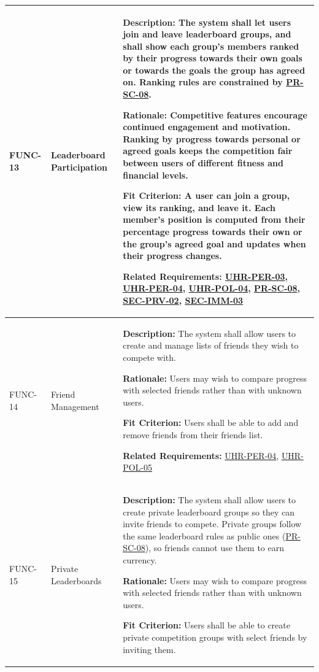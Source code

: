 \documentclass[12pt]{article}
\begin{document}
\begin{xltabular}{\textwidth}{|p{2.6cm}|p{3.4cm}|X|}
FUNC-13\hypertarget{req:FUNC-13}{} &
Leaderboard Participation &
\textbf{Description:} The system shall let users join and leave leaderboard groups, and shall show each group's members ranked by their progress towards their own goals or towards the goals the group has agreed on. Ranking rules are constrained by \hyperlink{req:PR-SC-08}{PR-SC-08}.

\textbf{Rationale:} Competitive features encourage continued engagement and motivation. Ranking by progress towards personal or agreed goals keeps the competition fair between users of different fitness and financial levels.

\textbf{Fit Criterion:} A user can join a group, view its ranking, and leave it. Each member's position is computed from their percentage progress towards their own or the group's agreed goal and updates when their progress changes.

\textbf{Related Requirements:} \hyperlink{req:UHR-PER-03}{UHR-PER-03}, \hyperlink{req:UHR-PER-04}{UHR-PER-04}, \hyperlink{req:UHR-POL-04}{UHR-POL-04}, \hyperlink{req:PR-SC-08}{PR-SC-08}, \hyperlink{req:SEC-PRV-02}{SEC-PRV-02}, \hyperlink{req:SEC-IMM-03}{SEC-IMM-03}\\
\hline

FUNC-14\hypertarget{req:FUNC-14}{} & 
Friend Management & 
\textbf{Description:} The system shall allow users to create and manage lists of friends they wish to compete with.

\textbf{Rationale:} Users may wish to compare progress with selected friends rather than with unknown users.

\textbf{Fit Criterion:} Users shall be able to add and remove friends from their friends list.

\textbf{Related Requirements:} \hyperlink{req:UHR-PER-04}{UHR-PER-04}, \hyperlink{req:UHR-POL-05}{UHR-POL-05}\\
\hline

FUNC-15\hypertarget{req:FUNC-15}{} & 
Private Leaderboards & 
\textbf{Description:} The system shall allow users to create private leaderboard groups so they can invite friends to compete. Private groups follow the same leaderboard rules as public ones (\hyperlink{req:PR-SC-08}{PR-SC-08}), so friends cannot use them to earn currency.

\textbf{Rationale:} Users may wish to compare progress with selected friends rather than with unknown users.

\textbf{Fit Criterion:} Users shall be able to create private competition groups with select friends by inviting them.


\end{xltabular}
\end{document}
